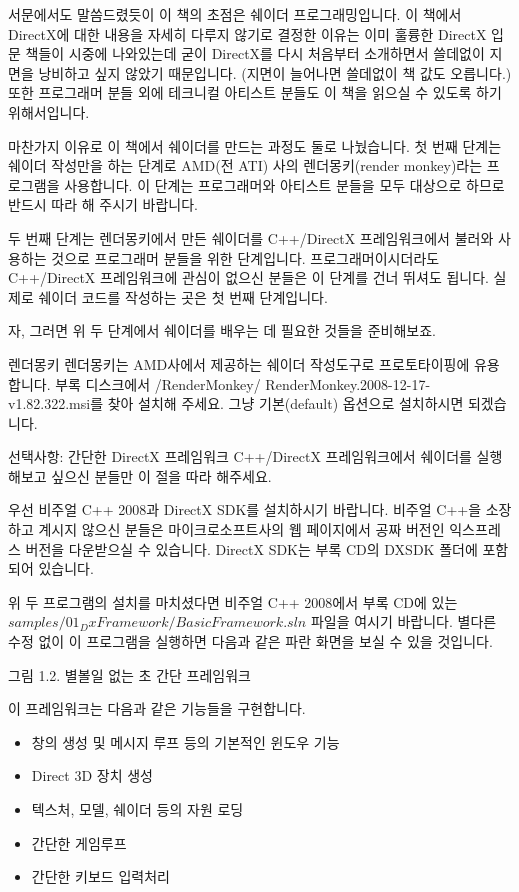 서문에서도 말씀드렸듯이 이 책의 초점은 쉐이더 프로그래밍입니다. 이 책에서 DirectX에 대한 내용을 자세히 다루지 않기로 결정한 이유는 이미 훌륭한 DirectX 입문 책들이 시중에 나와있는데 굳이 DirectX를 다시 처음부터 소개하면서 쓸데없이 지면을 낭비하고 싶지 않았기 때문입니다. (지면이 늘어나면 쓸데없이 책 값도 오릅니다.) 또한 프로그래머 분들 외에 테크니컬 아티스트 분들도 이 책을 읽으실 수 있도록 하기 위해서입니다.

마찬가지 이유로 이 책에서 쉐이더를 만드는 과정도 둘로 나눴습니다. 첫 번째 단계는 쉐이더 작성만을 하는 단계로 AMD(전 ATI) 사의 렌더몽키(render monkey)라는 프로그램을 사용합니다. 이 단계는 프로그래머와 아티스트 분들을 모두 대상으로 하므로 반드시 따라 해 주시기 바랍니다.

두 번째 단계는 렌더몽키에서 만든 쉐이더를 C++/DirectX 프레임워크에서 불러와 사용하는 것으로 프로그래머 분들을 위한 단계입니다. 프로그래머이시더라도 C++/DirectX 프레임워크에 관심이 없으신 분들은 이 단계를 건너 뛰셔도 됩니다. 실제로 쉐이더 코드를 작성하는 곳은 첫 번째 단계입니다.

자, 그러면 위 두 단계에서 쉐이더를 배우는 데 필요한 것들을 준비해보죠.

렌더몽키
렌더몽키는 AMD사에서 제공하는 쉐이더 작성도구로 프로토타이핑에 유용합니다. 부록 디스크에서 /RenderMonkey/ RenderMonkey.2008-12-17-v1.82.322.msi를 찾아 설치해 주세요. 그냥 기본(default) 옵션으로 설치하시면 되겠습니다.

선택사항: 간단한 DirectX 프레임워크
C++/DirectX 프레임워크에서 쉐이더를 실행해보고 싶으신 분들만 이 절을 따라 해주세요.

우선 비주얼 C++ 2008과 DirectX SDK를 설치하시기 바랍니다. 비주얼 C++을 소장하고 계시지 않으신 분들은 마이크로소프트사의 웹 페이지에서 공짜 버전인 익스프레스 버전을 다운받으실 수 있습니다. DirectX SDK는 부록 CD의 DXSDK 폴더에 포함되어 있습니다.

위 두 프로그램의 설치를 마치셨다면 비주얼 C++ 2008에서 부록 CD에 있는 $samples/01_DxFramework/BasicFramework.sln$ 파일을 여시기 바랍니다. 별다른 수정 없이 이 프로그램을 실행하면 다음과 같은 파란 화면을 보실 수 있을 것입니다.


그림 1.2. 별볼일 없는 초 간단 프레임워크


이 프레임워크는 다음과 같은 기능들을 구현합니다.

\begin{itemize}
    \item 창의 생성 및 메시지 루프 등의 기본적인 윈도우 기능
    \item Direct 3D 장치 생성
    \item 텍스처, 모델, 쉐이더 등의 자원 로딩
    \item 간단한 게임루프
    \item 간단한 키보드 입력처리
\end{itemize}

